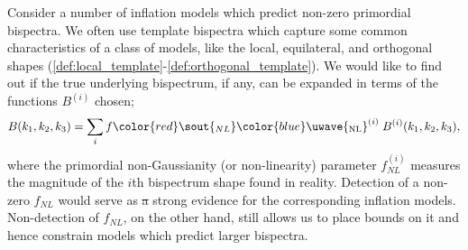\documentclass[a4paper,12pt,times,custombib,print,index]{Classes/PhDThesisPSnPDF} %
\providecommand{\DIFadd}[1]{{\protect\color{blue}\uwave{#1}}} %
\providecommand{\DIFdel}[1]{{\protect\color{red}\sout{#1}}}                      %
\providecommand{\DIFaddbegin}{} %
\providecommand{\DIFaddend}{} %
\providecommand{\DIFdelbegin}{} %
\providecommand{\DIFdelend}{} %
\newcommand{\DIFscaledelfig}{0.5}
\newlength{\DIFdelgraphicswidth} %
\newlength{\DIFdelgraphicsheight} %
\newcommand{\DIFaddincludegraphics}[2][]{{\color{blue}\fbox{\DIFOincludegraphics[#1]{#2}}}} %
\newcommand{\DIFdelincludegraphics}[2][]{%
\sbox{\DIFdelgraphicsbox}{\DIFOincludegraphics[#1]{#2}}%
\settoboxwidth{\DIFdelgraphicswidth}{\DIFdelgraphicsbox} %
\settoboxtotalheight{\DIFdelgraphicsheight}{\DIFdelgraphicsbox} %
\scalebox{\DIFscaledelfig}{%
\parbox[b]{\DIFdelgraphicswidth}{\usebox{\DIFdelgraphicsbox}\\[-\baselineskip] \rule{\DIFdelgraphicswidth}{0em}}\llap{\resizebox{\DIFdelgraphicswidth}{\DIFdelgraphicsheight}{%
\setlength{\unitlength}{\DIFdelgraphicswidth}%
\begin{picture}(1,1)%
\thicklines\linethickness{2pt} %
{\color[rgb]{1,0,0}\put(0,0){\framebox(1,1){}}}%
{\color[rgb]{1,0,0}\put(0,0){\line( 1,1){1}}}%
{\color[rgb]{1,0,0}\put(0,1){\line(1,-1){1}}}%
\end{picture}%
}\hspace*{3pt}}} %
} %
\DeclareRobustCommand{\DIFaddbegin}{\DIFOaddbegin \let\includegraphics\DIFaddincludegraphics} %
\DeclareRobustCommand{\DIFaddend}{\DIFOaddend \let\includegraphics\DIFOincludegraphics} %
\DeclareRobustCommand{\DIFdelbegin}{\DIFOdelbegin \let\includegraphics\DIFdelincludegraphics} %
\DeclareRobustCommand{\DIFdelend}{\DIFOaddend \let\includegraphics\DIFOincludegraphics} %
\begin{document}
Consider a number of inflation models which predict non-zero primordial bispectra. We often use template bispectra which capture some common characteristics of a class of models, like the local, equilateral, and orthogonal shapes (\ref{def:local_template}-\ref{def:orthogonal_template}). We would like to find out if the true underlying bispectrum, if any, can be expanded in terms of the functions $B^{(i)}$ chosen;
\begin{align}
	B(k_1,k_2,k_3) = \sum_i f\DIFdelbegin \DIFdel{_{NL}}\DIFdelend \DIFaddbegin \DIFadd{_\text{NL}}\DIFaddend ^{(i)} \; B^{(i)}(k_1,k_2,k_3), \label{eqn:primordial_bispectrum_fNLs}
\end{align}
where the primordial non-Gaussianity (or non-linearity) parameter \DIFdelbegin \DIFdel{$f^{(i)}_{NL}$ }\DIFdelend \DIFaddbegin \DIFadd{$f^{(i)}_\text{NL}$ }\DIFaddend measures the magnitude of the $i$th bispectrum shape found in reality. Detection of a non-zero \DIFdelbegin \DIFdel{$f_{NL}$ }\DIFdelend \DIFaddbegin \DIFadd{$f_\text{NL}$ }\DIFaddend would serve as \DIFdelbegin \DIFdel{a }\DIFdelend strong evidence for the corresponding inflation models. Non-detection of \DIFdelbegin \DIFdel{$f_{NL}$}\DIFdelend \DIFaddbegin \DIFadd{$f_\text{NL}$}\DIFaddend , on the other hand, still allows us to place bounds on it and hence constrain models which predict larger bispectra.
\end{document}
